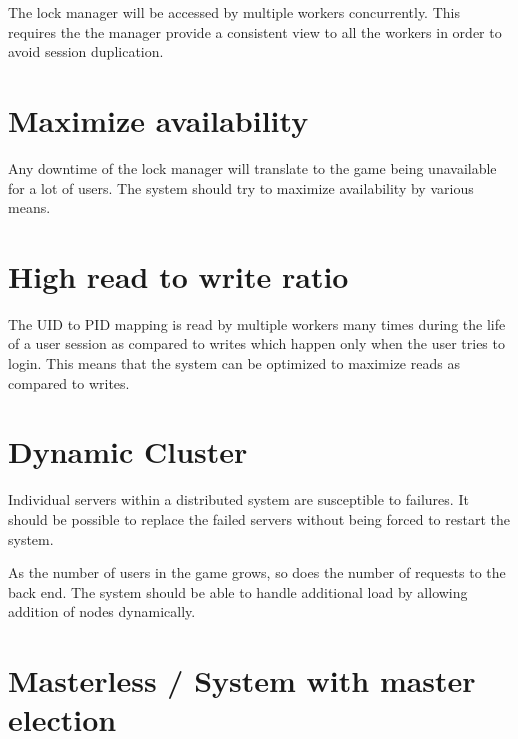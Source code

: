 The lock manager will be accessed by multiple workers concurrently. This
requires the the manager provide a consistent view to all the workers in
order to avoid session duplication.

\section{Maximize availability}


Any downtime of the lock manager will translate to the game being unavailable
for a lot of users. The system should try to maximize availability by various
means.

\section{High read to write ratio}
\label{section:req.read.write.ratio}


The UID to PID mapping is read by multiple workers many times during the life
of a user session as compared to writes which happen only when the user tries
to login. This means that the system can be optimized to maximize reads as
compared to writes.

\section{Dynamic Cluster}
\label{section:req.dynamic.cluster}


Individual servers within a distributed system are susceptible to failures.
It should be possible to replace the failed servers without being forced
to restart the system.

As the number of users in the game grows, so does the number of requests to
the back end. The system should be able to handle additional load by allowing
addition of nodes dynamically.


\section{Masterless / System with master election}


